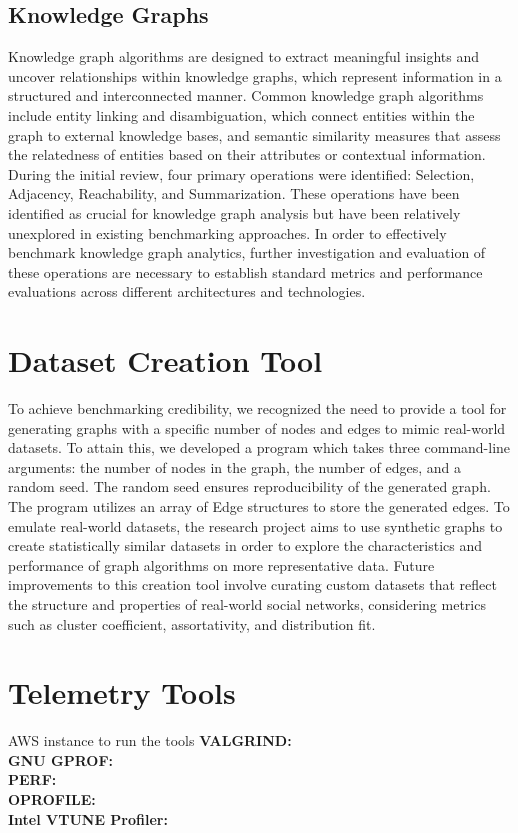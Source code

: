 \documentclass[letterpaper, 10pt]{article}
\begin{document}
\begin{multicols}{2}
        \subsection{Knowledge Graphs}
            Knowledge graph algorithms are designed to extract meaningful insights and uncover relationships within knowledge graphs, which represent information in a structured and interconnected manner. Common knowledge graph algorithms include entity linking and disambiguation, which connect entities within the graph to external knowledge bases, and semantic similarity measures that assess the relatedness of entities based on their attributes or contextual information. During the initial review, four primary operations were identified: Selection, Adjacency, Reachability, and Summarization. These operations have been identified as crucial for knowledge graph analysis but have been relatively unexplored in existing benchmarking approaches. In order to effectively benchmark knowledge graph analytics, further investigation and evaluation of these operations are necessary to establish standard metrics and performance evaluations across different architectures and technologies.
    \section{Dataset Creation Tool}
        To achieve benchmarking credibility, we recognized the need to provide a tool for generating graphs with a specific number of nodes and edges to mimic real-world datasets. To attain this, we developed a program which takes three command-line arguments: the number of nodes in the graph, the number of edges, and a random seed. The random seed ensures reproducibility of the generated graph. The program utilizes an array of Edge structures to store the generated edges. To emulate real-world datasets, the research project aims to use synthetic graphs to create statistically similar datasets in order to explore the characteristics and performance of graph algorithms on more representative data. Future improvements to this creation tool involve curating custom datasets that reflect the structure and properties of real-world social networks, considering metrics such as cluster coefficient, assortativity, and distribution fit. 
    \section{Telemetry Tools}
        AWS instance to run the tools
        \textbf{VALGRIND:} \\  
        \textbf{GNU GPROF:}  \\
        \textbf{PERF:}  \\
        \textbf{OPROFILE:} \\
        \textbf{Intel VTUNE Profiler:} \\
       

\end{multicols}
\end{document}

